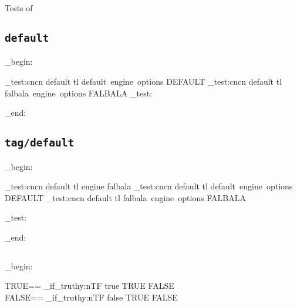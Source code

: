 Tests of 
\noindent

\newcommand\meta[1]{{$\langle$}{\itshape #1}{$\rangle$}}

\subsection{\texttt{default}}
\ExplSyntaxOn
\group_begin:
\ExplSyntaxOff


\ExplSyntaxOn

\CDR_test:cncn { default } { tl } { default~engine~options } { DEFAULT }
\CDR_test:cncn { default } { tl } { falbala~engine~options } { FALBALA }
\CDR_test:

\group_end:

\ExplSyntaxOff


\ExplSyntaxOn

\makeatletter
\def\CDR@Debug{\typeout}
\makeatother

\ExplSyntaxOff

\subsection{\texttt{tag/default}}
\ExplSyntaxOn
\group_begin:
\ExplSyntaxOff


\ExplSyntaxOn
\CDR_test:cncn { default } { tl } { engine } { falbala }
\CDR_test:cncn { default } { tl } { default~engine~options } { DEFAULT }
\CDR_test:cncn { default } { tl } { falbala~engine~options } { FALBALA }

\CDR_test:

\group_end:
\ExplSyntaxOff

\subsection{}
\ExplSyntaxOn
\group_begin:

TRUE==
\CDR_if_truthy:nTF { true } {
  TRUE
} {
  FALSE
}\\
FALSE==
\CDR_if_truthy:nTF { false } {
  TRUE
} {
  FALSE
}\\


